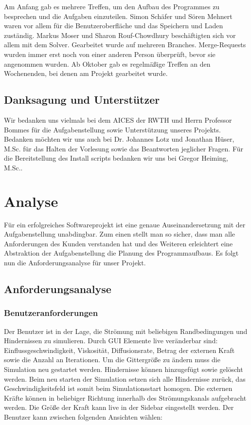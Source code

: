 \documentclass[a4paper,12pt]{scrreprt}
\begin{document}
Am Anfang gab es mehrere Treffen, um den Aufbau des Programmes zu besprechen und die Aufgaben einzuteilen. Simon Sch\"afer und S\"oren Mehnert waren vor allem für die Benutzeroberfläche und das Speichern und Laden zuständig. Markus Moser und Sharon Rouf-Chowdhury  besch\"aftigten sich vor allem mit dem Solver.
Gearbeitet wurde auf mehreren Branches. Merge-Requests wurden immer erst noch von einer anderen Person überprüft, bevor sie angenommen wurden. Ab Oktober gab es regelm\"a\ss ige Treffen an den Wochenenden, bei denen am Projekt gearbeitet wurde. 


\section{Danksagung und Unterst\"utzer}


Wir bedanken uns vielmals bei dem AICES der RWTH und Herrn Professor Bommes für die Aufgabenstellung sowie Unterst\"utzung unseres Projekts. Bedanken m\"ochten wir uns auch bei Dr. Johannes Lotz und Jonathan H\"user, M.Sc. für das Halten der Vorlesung sowie das Beantworten jeglicher Fragen. F\"ur die Bereitstellung des Install scripts bedanken wir uns bei Gregor Heiming, M.Sc..

\chapter{Analyse}
Für ein erfolgreiches Softwareprojekt ist eine genaue Auseinandersetzung mit der Aufgabenstellung unabdingbar. Zum einen stellt man so sicher, dass man alle Anforderungen des Kunden verstanden hat und des Weiteren erleichtert eine Abstraktion der Aufgabenstellung die Planung des Programmaufbaus.
Es folgt nun die Anforderungsanalyse f\"ur unser Projekt. 

\section{Anforderungsanalyse}

\subsection{Benutzeranforderungen}
\textcolor{dark-gray}{\textit{}}
Der Benutzer ist in der Lage, die Str\"omung mit beliebigen Randbedingungen und Hindernissen zu simulieren.
Durch GUI Elemente live ver\"anderbar sind: Einflussgeschwindigkeit, Viskosit\"at, Diffusionsrate, Betrag der externen Kraft sowie die Anzahl an Iterationen. Um die Gittergr\"o\ss e zu \"andern muss die Simulation neu gestartet werden. Hindernisse k\"onnen hinzugef\"ugt sowie gel\"oscht werden. Beim neu starten der Simulation setzen sich alle Hindernisse zur\"uck, das Geschwindigkeitsfeld ist somit beim Simulationsstart homogen. Die externen Kr\"afte k\"onnen in beliebiger Richtung innerhalb des Str\"omungskanals aufgebracht werden. Die Gr\"o\ss e der Kraft kann live in der Sidebar eingestellt werden.
Der Benutzer kann zwischen folgenden Ansichten w\"ahlen:
\end{document}
